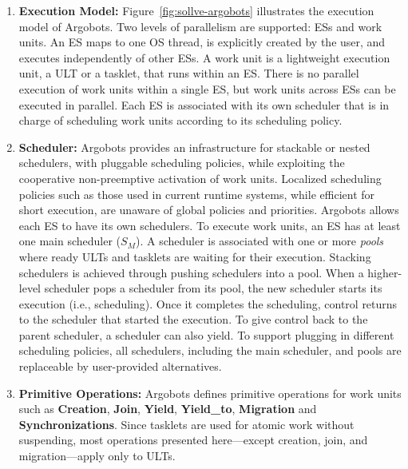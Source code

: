 \begin{enumerate}

\item \textbf{Execution Model:} Figure~\ref{fig:sollve-argobots}
  illustrates the execution model of Argobots. Two levels of
  parallelism are supported: ESs and work units. An ES maps to one OS
  thread, is explicitly created by the user, and executes
  independently of other ESs. A work unit is a lightweight execution
  unit, a ULT or a tasklet, that runs within an ES.  There is no
  parallel execution of work units within a single ES, but work units
  across ESs can be executed in parallel.  Each ES is associated with
  its own scheduler that is in charge of scheduling work units
  according to its scheduling policy.

\item \textbf{Scheduler:} Argobots provides an infrastructure for
  stackable or nested schedulers, with pluggable scheduling policies,
  while exploiting the cooperative non-preemptive activation of work
  units. Localized scheduling policies such as those used in current
  runtime systems, while efficient for short execution, are unaware of
  global policies and priorities. Argobots allows each ES to have its
  own schedulers.  To execute work units, an ES has at least one main
  scheduler ($S_{M}$).  A scheduler is associated with one or more
  \textit{pools} where ready ULTs and tasklets are waiting for their
  execution.  Stacking schedulers is achieved through pushing
  schedulers into a pool. When a higher-level scheduler pops a
  scheduler from its pool, the new scheduler starts its execution
  (i.e., scheduling).  Once it completes the scheduling, control
  returns to the scheduler that started the execution. To give control
  back to the parent scheduler, a scheduler can also yield.  To
  support plugging in different scheduling policies, all schedulers,
  including the main scheduler, and pools are replaceable by
  user-provided alternatives.

\item \textbf{Primitive Operations:} Argobots defines primitive
  operations for work units such as \textbf{Creation}, \textbf{Join},
  \textbf{Yield}, \textbf{Yield\_to}, \textbf{Migration} and
  \textbf{Synchronizations}. Since tasklets are used for atomic work
  without suspending, most operations presented here---except
  creation, join, and migration---apply only to ULTs.

\end{enumerate}


